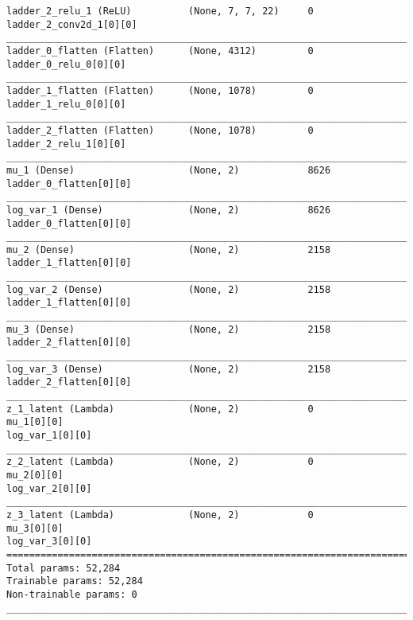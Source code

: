 \begin{lstlisting}[caption={\textsc{Mnist}-\ac{VLAE}-factor-3 Encoder},captionpos=b,basicstyle=\tiny, label={lst:sparsity-vlae-encoder-28-fm3}]
ladder_2_relu_1 (ReLU)          (None, 7, 7, 22)     0           ladder_2_conv2d_1[0][0]
__________________________________________________________________________________________________
ladder_0_flatten (Flatten)      (None, 4312)         0           ladder_0_relu_0[0][0]
__________________________________________________________________________________________________
ladder_1_flatten (Flatten)      (None, 1078)         0           ladder_1_relu_0[0][0]
__________________________________________________________________________________________________
ladder_2_flatten (Flatten)      (None, 1078)         0           ladder_2_relu_1[0][0]
__________________________________________________________________________________________________
mu_1 (Dense)                    (None, 2)            8626        ladder_0_flatten[0][0]
__________________________________________________________________________________________________
log_var_1 (Dense)               (None, 2)            8626        ladder_0_flatten[0][0]
__________________________________________________________________________________________________
mu_2 (Dense)                    (None, 2)            2158        ladder_1_flatten[0][0]
__________________________________________________________________________________________________
log_var_2 (Dense)               (None, 2)            2158        ladder_1_flatten[0][0]
__________________________________________________________________________________________________
mu_3 (Dense)                    (None, 2)            2158        ladder_2_flatten[0][0]
__________________________________________________________________________________________________
log_var_3 (Dense)               (None, 2)            2158        ladder_2_flatten[0][0]
__________________________________________________________________________________________________
z_1_latent (Lambda)             (None, 2)            0           mu_1[0][0]
log_var_1[0][0]
__________________________________________________________________________________________________
z_2_latent (Lambda)             (None, 2)            0           mu_2[0][0]
log_var_2[0][0]
__________________________________________________________________________________________________
z_3_latent (Lambda)             (None, 2)            0           mu_3[0][0]
log_var_3[0][0]
==================================================================================================
Total params: 52,284
Trainable params: 52,284
Non-trainable params: 0
__________________________________________________________________________________________________
\end{lstlisting}